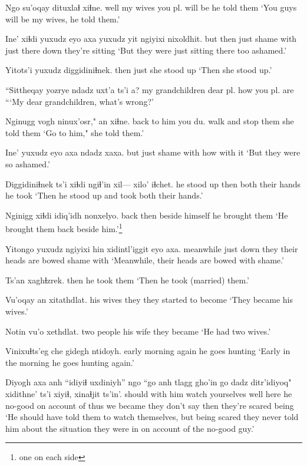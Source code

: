 \documentclass[12pt]{article}
\begin{document}
\gll Ngo  su'oqay  dituxlaɬ     xiɬne.
well {my wives} {you pl. will be} {he told them}
\glt `You guys will be my wives, he told them.'
\glend

\gll Ine' xiɬdi yuxudz eyo   axa  yuxudz yit   ngiyixi nixoldhit.
but  then  just   shame with just   there down    {they're sitting}
\glt `But they were just sitting there too ashamed.'
\glend

\gll Yitots'i yuxudz diggidiniɬnek.
then     just   {she stood up}
\glt `Then she stood up.'
\glend

\gll ``Sittheqay        yozrye   ndadz uxt'a               ts'i a?
{my grandchildren} {dear pl.} how {you pl. are}
\glt ```My dear grandchildren, what's wrong?' 
\glend

\gll  Nginugg vogh   ninux'osr,"           an   xiɬne.
back    {to him} {you du. walk and stop} them {she told them}
\glt `Go to him," she told them.'
\glend

\gll Ine' yuxudz eyo   axa  ndadz xaxa.
but just shame with how {with it}
\glt `But they were so ashamed.'
\glend

\gll Diggidiniɬnek ts'i xiɬdi ngiɬ'in xil--- xilo'       iɬchet.
{he stood up}     {}   then  both  {} {their hands} {he took}
\glt `Then he stood up and took both their hands.'
\glend

\gll Nginigg xiɬdi idiq'idh   nonxelyo.
back then {beside himself} {he brought them}
\glt `He brought them back beside him.'\footnote{one on each side}
\glend

\gll Yitongo   yuxudz ngiyixi hin xidintl'iggit         eyo   axa.
meanwhile just   down  they  {their heads are bowed} shame with
\glt `Meanwhile, their heads are bowed with shame.'
\glend

\gll Ts'an xaghɬzrek.
then  {he took them}
\glt `Then he took (married) them.'
\glend

\gll Vu'oqay   an   xitathdlat. 
{his wives} they {they started to become}  
\glt `They became his wives.'
\glend

\gll  Notin    vu'o     xethdlat.
{two people} {his wife} {they became}
\glt `He had two wives.'
\glend

\gll Vinixuɬts'eg   che {gidegh ntidoyh.}
{early morning} again {he goes hunting}
\glt `Early in the morning he goes hunting again.'
\glend

\gll Diyogh axa anh ``{idiyiɬ uxdiniyh}'' ngo ``go anh tlagg gho'in {go dadz} ditr'idiyoq" {xidithne' ts'i} xiyiɬ, xinaɬjit       ts'in'.
should with him {watch  yourselves} well  here he  no-good {on account of} thus {we became} {they don't say} then   {they're scared} being
\glt `He should have told them to watch themselves, but being scared they never told him about the situation they were in on account of the no-good guy.'
\glend
\end{document}
